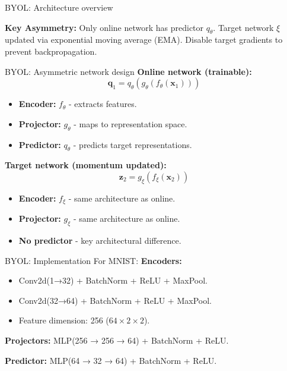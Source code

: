 \documentclass{beamer}
\begin{document}
\begin{frame}{BYOL: Architecture overview}
\begin{center}
\end{center}

\vspace{0.3cm} \textbf{Key Asymmetry:} Only online network has
predictor $q_\theta$. Target network $\xi$ updated via exponential
moving average (EMA). Disable target gradients to prevent
backpropagation.
\end{frame}

\begin{frame}{BYOL: Asymmetric network design}
\textbf{Online network (trainable):}
$$\mathbf{q}_1 = q_\theta(g_\theta(f_\theta(\mathbf{x}_1)))$$
\begin{itemize}
\item \textbf{Encoder:} $f_\theta$ - extracts features.
\item \textbf{Projector:} $g_\theta$ - maps to representation space.  
\item \textbf{Predictor:} $q_\theta$ - predicts target representations.
\end{itemize}
\textbf{Target network (momentum updated):}
$$\mathbf{z}_2 = g_\xi(f_\xi(\mathbf{x}_2))$$
\begin{itemize}
\item \textbf{Encoder:} $f_\xi$ - same architecture as online.
\item \textbf{Projector:} $g_\xi$ - same architecture as online.
\item \textbf{No predictor} - key architectural difference.
\end{itemize}

\end{frame}

\begin{frame}{BYOL: Implementation}
  For MNIST:
  \textbf{Encoders:} 
  \vspace{0.3cm}
  \begin{itemize}
  \item Conv2d(1→32) + BatchNorm + ReLU + MaxPool.
    \vspace{0.3cm}
  \item Conv2d(32→64) + BatchNorm + ReLU + MaxPool.  
    \vspace{0.3cm}
  \item Feature dimension: 256 ($64 \times 2 \times 2$).
  \end{itemize}

\vspace{0.5cm}

\textbf{Projectors:} MLP(256 → 256 → 64) + BatchNorm + ReLU.

\vspace{0.5cm}

\textbf{Predictor:} MLP(64 → 32 → 64) + BatchNorm + ReLU.

\end{frame}
\end{document}
